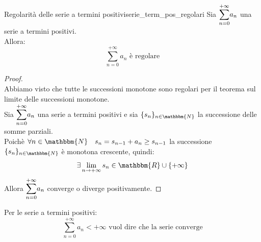 \documentclass[12pt]{report}
\newcounter{theorem}
\newcommand{\nmu}{}
\begin{document}
 		\begin{theorem}{\nmu Regolarità delle serie a termini positivi}{serie_term_pos_regolari}
 			Sia $\mathlarger{\sum_{n=0}^{+\infty}}a_n$ una serie a termini positivi. \\
 			Allora:
 			\[
 			\sum_{n=0}^{+\infty}a_n \text{ è regolare}
 			\]
 			\begin{proof} \quad \\
 				Abbiamo visto che tutte le successioni monotone sono regolari per il teorema sul limite delle successioni monotone. \\
 				Sia $\mathlarger{\sum_{n=0}^{+\infty}}a_n$ una serie a termini positivi e sia $\{s_n\}_{n\in\mathbbm{N}}$ la successione delle somme parziali. \\
 				Poichè $\forall n \in \mathbbm{N} \quad s_n = s_{n-1} + a_n \geq s_{n-1}$ la successione $\{s_n\}_{n\in\mathbbm{N}}$ è monotona crescente, quindi:
 				\[
 				\exists \lim_{n \to +\infty}s_n \in \mathbbm{R} \cup \{+\infty\}
 				\]
 				Allora $\mathlarger{\sum_{n=0}^{+\infty}}a_n$ converge o diverge positivamente.
  			\end{proof}
 		\end{theorem}
 		\begin{note}{}{}
 			Per le serie a termini positivi:
 			\[
 			\sum_{n=0}^{+\infty}a_n < +\infty \text{ vuol dire che la serie converge}
 			\]
 		\end{note}
\end{document}
